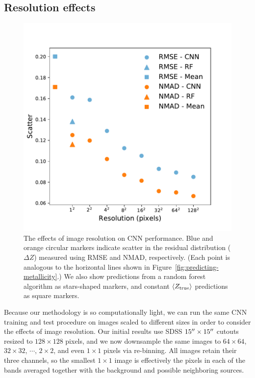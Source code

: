 \documentclass[fleqn,usenatbib]{mnras}
\begin{document}
\subsection{Resolution effects} \label{sec:resolution}

\begin{figure}
	\includegraphics[width=\columnwidth]{04-resolution.pdf}
	\caption{\label{fig:resolution}
		The effects of image resolution on CNN performance. Blue and orange circular markers indicate scatter in the residual distribution ($\Delta Z$) measured using RMSE and NMAD, respectively. (Each point is analogous to the horizontal lines shown in Figure~\ref{fig:predicting-metallicity}.) We also show predictions from a random forest algorithm as stars-shaped markers, and constant $\langle Z_{\rm true}\rangle$ predictions as square markers.}
\end{figure}

Because our methodology is so computationally light, we can run the same CNN training and test procedure on images scaled to different sizes in order to consider the effects of image resolution. Our initial results use SDSS $15\hbox{$^{\prime\prime}$} \times 15 \hbox{$^{\prime\prime}$}$ cutouts resized to $128\times 128$ pixels, and we now downsample the same images to $64\times 64$, $32 \times 32$, $\cdots$, $2\times 2$, and even $1\times 1$ pixels via re-binning. All images retain their three channels, so the smallest $1 \times 1$ image is effectively the pixels in each of the \sdssi\sdssr\sdssg{} bands averaged together with the background and possible neighboring sources.
\end{document}
